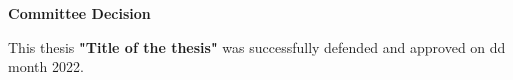 

\vspace*{+1em}
\begin{center}
\textbf{\Large Committee Decision}
%

\end{center}

\vspace*{+1em}

This thesis \textbf{ "Title of the thesis" }was successfully defended and approved on dd month 2022.

\vspace*{+1em}

